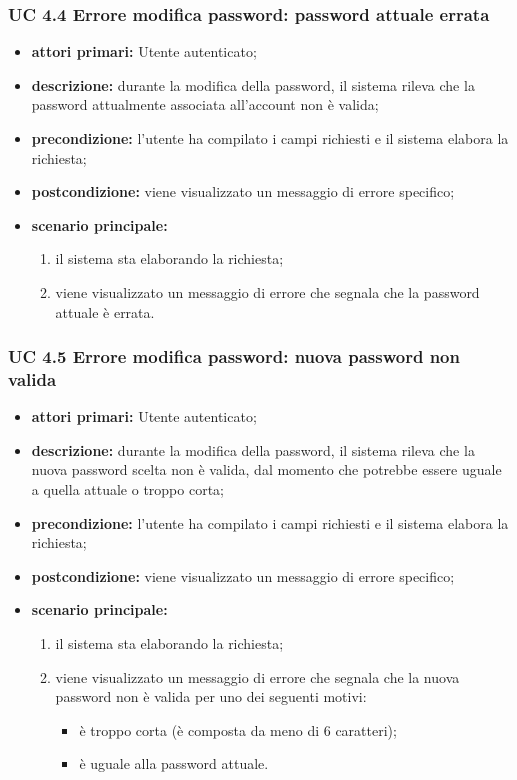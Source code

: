 			\subsubsection{UC 4.4 Errore modifica password: password attuale errata}
			\begin{itemize}
				\item \textbf{attori primari:} Utente autenticato;
				\item \textbf{descrizione:} durante la modifica della password, il sistema rileva che la password attualmente associata all'account non è valida;
				\item \textbf{precondizione:} l'utente ha compilato i campi richiesti e il sistema elabora la richiesta;
				\item \textbf{postcondizione:} viene visualizzato un messaggio di errore specifico;
				\item \textbf{scenario principale:}
				\begin{enumerate}
					\item il sistema sta elaborando la richiesta;
					\item viene visualizzato un messaggio di errore che segnala che la password attuale è errata.
				\end{enumerate}
			\end{itemize}

			\subsubsection{UC 4.5 Errore modifica password: nuova password non valida}
			\begin{itemize}
				\item \textbf{attori primari:} Utente autenticato;
				\item \textbf{descrizione:} durante la modifica della password, il sistema rileva che la nuova password scelta non è valida, dal momento che potrebbe essere uguale a quella attuale o troppo corta;
				\item \textbf{precondizione:} l'utente ha compilato i campi richiesti e il sistema elabora la richiesta;
				\item \textbf{postcondizione:} viene visualizzato un messaggio di errore specifico;
				\item \textbf{scenario principale:}
				\begin{enumerate}
					\item il sistema sta elaborando la richiesta;
					\item viene visualizzato un messaggio di errore che segnala che la nuova password non è valida per uno dei seguenti motivi:
					\begin{itemize}
						\item è troppo corta (è composta da meno di 6 caratteri);
						\item è uguale alla password attuale.
					\end{itemize}
				\end{enumerate}
			\end{itemize}

